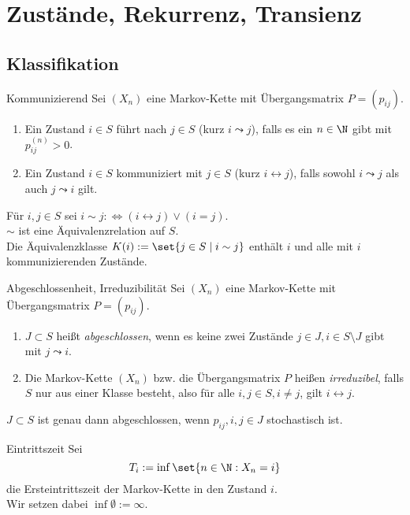 \section{Zustände, Rekurrenz, Transienz}

\subsection*{Klassifikation}

\begin{karte}{Kommunizierend}
    Sei \((X_n)\) eine Markov-Kette mit Übergangsmatrix \(P = (p_{ij})\). 
    \begin{enumerate}
        \item Ein Zustand \(i\in S\) führt nach \(j\in S\) (kurz \(i \leadsto j\)), falls es ein \(n\in\N\) gibt mit \(p_{ij}^{(n)} > 0\).
        \item Ein Zustand \(i\in S\) kommuniziert mit \(j\in S\) (kurz \(i \leftrightarrow j\)), falls sowohl \(i \leadsto j\) als auch \(j \leadsto i\) gilt.
    \end{enumerate}

    Für \(i,j \in S\) sei \(i \sim j :\Leftrightarrow (i\leftrightarrow j) \vee (i = j)\). \\
    \(\sim \) ist eine Äquivalenzrelation auf \(S\).\\
    Die Äquivalenzklasse \(K(i) := \set{j\in S \;|\; i \sim j}\) enthält \(i\) und alle 
    mit \(i\) kommunizierenden Zustände.
\end{karte}

\begin{karte}{Abgeschlossenheit, Irreduzibilität}
    Sei \((X_n)\) eine Markov-Kette mit Übergangsmatrix \(P = (p_{ij})\).
    \begin{enumerate}
        \item \(J\subset S\) heißt \textit{abgeschlossen}, wenn es keine zwei Zustände 
        \(j\in J, i \in S \setminus J\) gibt mit \(j\leadsto i\).
        \item Die Markov-Kette \((X_n)\) bzw. die Übergangsmatrix \(P\) 
        heißen \textit{irreduzibel}, falls \(S\) nur aus einer Klasse besteht, 
        also für alle \(i,j\in S, i\neq j\), gilt \(i \leftrightarrow j\).
    \end{enumerate}

    \(J\subset S\) ist genau dann abgeschlossen, wenn \(p_{ij}, i,j\in J\) 
    stochastisch ist.
\end{karte}

\begin{karte}{Eintrittszeit}
    Sei 
    \[ T_i := \inf \set{n\in \N: X_n = i} \]
    die Ersteintrittszeit der Markov-Kette in den Zustand \(i\). \\
    Wir setzen dabei \(\inf \emptyset := \infty\).
\end{karte}

